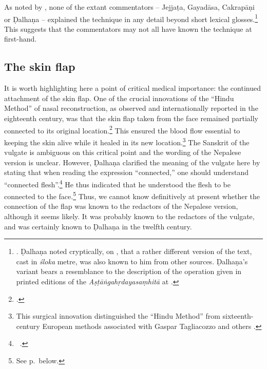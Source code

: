 As noted by \citeauthor{meul-hist}, none of the extant commentators -- Jejjaṭa,
Gayadāsa, Cakrapāṇi or Ḍalhaṇa -- explained the technique in any detail beyond
short lexical glosses.\footnote{\cite[IB, 328]{meul-hist}. Ḍalhaṇa noted cryptically, on
    , that a rather different version of the
    text, cast in \emph{śloka} metre, was also known to him from other sources.
    Ḍalhaṇa's variant bears a resemblance to the description of the operation given in
    printed editions of the \emph{Aṣṭāṅgahṛdayasaṃhitā} at .}
    This suggests that the commentators may not all have known the technique at
    first-hand. %

\subsection{The skin flap} \label{skinflap} It is worth highlighting here a
point of critical medical importance: the continued attachment of the skin flap.
One of the crucial innovations of the “Hindu Method” of nasal reconstruction, as
observed  and internationally reported in the eighteenth century, was that the
skin flap taken from the face remained partially connected to its original
location.\footcite[See][67--70]{wuja-2003} This ensured the blood flow essential
to keeping the skin alive while it healed in its new location.\footnote{This
    surgical innovation distinguished the “Hindu Method” from sixteenth-century
    European methods associated with Gaspar Tagliacozzo and others \citep[see,
    e.g.,][\emph{passim}]{carp-acco}.}  The Sanskrit of the vulgate is ambiguous on
    this critical point and the wording of the Nepalese version is unclear. However,
    Ḍalhaṇa clarified the meaning of the vulgate here by stating that when reading the
    expression “connected,” one should understand “connected flesh”.\footnote{\SS\
        .}  He thus indicated that he understood the flesh to be connected
        to the face.\footnote{See p.\,\pageref{well-joined} below.}  Thus, we cannot know
            definitively at present whether the connection of the flap was known to the
            redactors of the Nepalese version, although it seems likely.  It was probably
            known to the redactors of the vulgate, and was certainly known to Ḍalhaṇa in the
            twelfth century.
        
